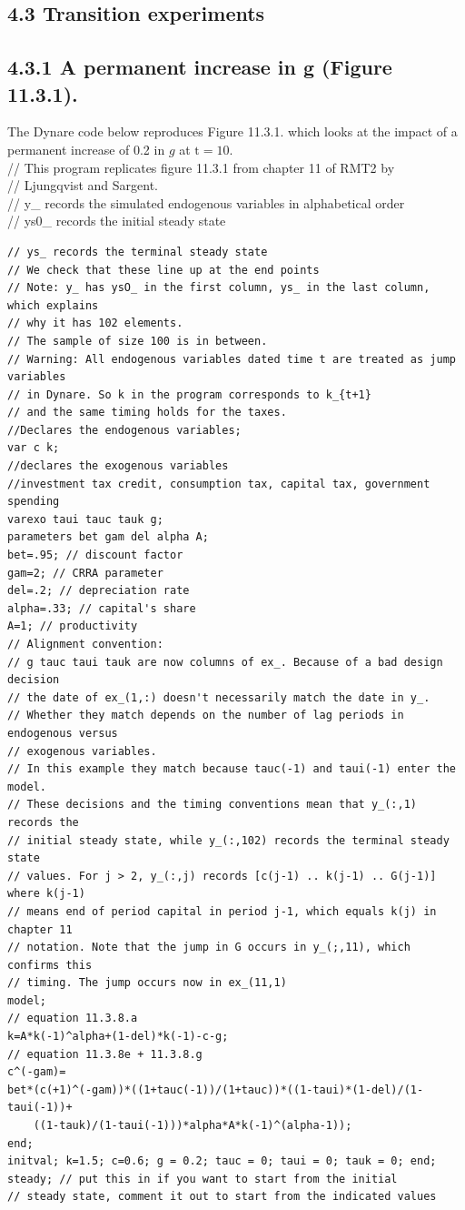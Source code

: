 \documentclass[10pt]{article}
\begin{document}
\subsection*{4.3 Transition experiments}
\subsection*{4.3.1 A permanent increase in g (Figure 11.3.1).}
The Dynare code below reproduces Figure 11.3.1. which looks at the impact of a permanent increase of 0.2 in $g$ at $\mathrm{t}=10$.\\
// This program replicates figure 11.3.1 from chapter 11 of RMT2 by\\
// Ljungqvist and Sargent.\\
// y\_ records the simulated endogenous variables in alphabetical order\\
// ys0\_ records the initial steady state

\begin{verbatim}
// ys_ records the terminal steady state
// We check that these line up at the end points
// Note: y_ has ysO_ in the first column, ys_ in the last column, which explains
// why it has 102 elements.
// The sample of size 100 is in between.
// Warning: All endogenous variables dated time t are treated as jump variables
// in Dynare. So k in the program corresponds to k_{t+1}
// and the same timing holds for the taxes.
//Declares the endogenous variables;
var c k;
//declares the exogenous variables
//investment tax credit, consumption tax, capital tax, government spending
varexo taui tauc tauk g;
parameters bet gam del alpha A;
bet=.95; // discount factor
gam=2; // CRRA parameter
del=.2; // depreciation rate
alpha=.33; // capital's share
A=1; // productivity
// Alignment convention:
// g tauc taui tauk are now columns of ex_. Because of a bad design decision
// the date of ex_(1,:) doesn't necessarily match the date in y_.
// Whether they match depends on the number of lag periods in endogenous versus
// exogenous variables.
// In this example they match because tauc(-1) and taui(-1) enter the model.
// These decisions and the timing conventions mean that y_(:,1) records the
// initial steady state, while y_(:,102) records the terminal steady state
// values. For j > 2, y_(:,j) records [c(j-1) .. k(j-1) .. G(j-1)] where k(j-1)
// means end of period capital in period j-1, which equals k(j) in chapter 11
// notation. Note that the jump in G occurs in y_(;,11), which confirms this
// timing. The jump occurs now in ex_(11,1)
model;
// equation 11.3.8.a
k=A*k(-1)^alpha+(1-del)*k(-1)-c-g;
// equation 11.3.8e + 11.3.8.g
c^(-gam)=
bet*(c(+1)^(-gam))*((1+tauc(-1))/(1+tauc))*((1-taui)*(1-del)/(1-taui(-1))+
    ((1-tauk)/(1-taui(-1)))*alpha*A*k(-1)^(alpha-1));
end;
initval; k=1.5; c=0.6; g = 0.2; tauc = 0; taui = 0; tauk = 0; end;
steady; // put this in if you want to start from the initial
// steady state, comment it out to start from the indicated values
\end{verbatim}
\end{document}
